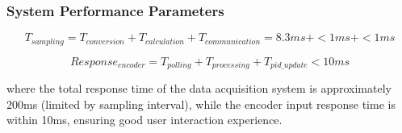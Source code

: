 \documentclass{article}
\begin{document}
\subsubsection{System Performance Parameters}

\begin{equation}
T_{sampling} = T_{conversion} + T_{calculation} + T_{communication} = 8.3ms + <1ms + <1ms
\end{equation}

\begin{equation}
Response_{encoder} = T_{polling} + T_{processing} + T_{pid\_update} < 10ms
\end{equation}

where the total response time of the data acquisition system is approximately 200ms (limited by sampling interval), while the encoder input response time is within 10ms, ensuring good user interaction experience.
\end{document}
